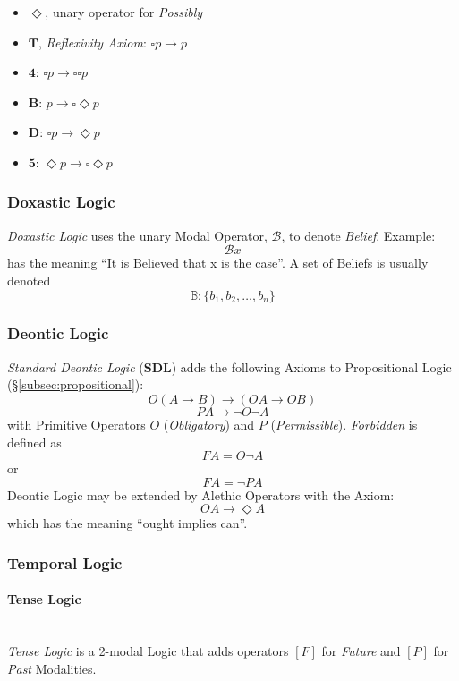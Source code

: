 \documentclass{article}
\begin{document}
\begin{itemize}
\item $\Diamond$, unary operator for \emph{Possibly}
\item $\mathbf{T}$, \emph{Reflexivity Axiom}: $\square p \rightarrow p$
\item $\mathbf{4}$: $\square p \rightarrow \square \square p$
\item $\mathbf{B}$: $p \rightarrow \square \Diamond p$
\item $\mathbf{D}$: $\square p \rightarrow \Diamond p$
\item $\mathbf{5}$: $\Diamond p \rightarrow \square \Diamond p$
\end{itemize}

\subsubsection{Doxastic Logic}

\emph{Doxastic Logic} uses the unary Modal Operator, $\mathcal{B}$, to
denote \emph{Belief}. Example:
\[
    \mathcal{B} x
\]
has the meaning ``It is Believed that x is the case''. A set of
Beliefs is usually denoted
\[
    \mathbb{B}: \{ b_1, b_2, \ldots, b_n \}
\]

\subsubsection{Deontic Logic}

\emph{Standard Deontic Logic} ($\mathbf{SDL}$) adds the following
Axioms to Propositional Logic (\S\ref{subsec:propositional}):
    \[O(A \rightarrow B) \rightarrow (OA \rightarrow OB)\]
    \[PA \rightarrow \neg O \neg A\]
with Primitive Operators $O$ (\emph{Obligatory}) and $P$
(\emph{Permissible}). \emph{Forbidden} is defined as
    \[FA = O \neg A\]
or
    \[FA = \neg P A\]
Deontic Logic may be extended by Alethic Operators with the Axiom:
    \[OA \rightarrow \Diamond A\]
which has the meaning ``ought implies can''.

\subsubsection{Temporal Logic}

\paragraph{Tense Logic} \hfill \\

\emph{Tense Logic} is a 2-modal Logic that adds operators $[F]$ for
\emph{Future} and $[P]$ for \emph{Past} Modalities.
\end{document}
